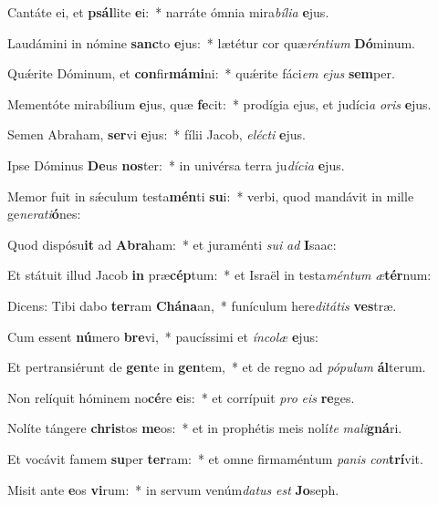 \item Cantáte ei, et \textbf{psál}lite \textbf{e}i:~* narráte ómnia mira\textit{bí}\textit{li}\textit{a} \textbf{e}jus.
\item Laudámini in nómine \textbf{sanc}to \textbf{e}jus:~* lætétur cor quæ\textit{rén}\textit{ti}\textit{um} \textbf{Dó}minum.
\item Quǽrite Dóminum, et \textbf{con}fir\textbf{má}\textbf{mi}ni:~* quǽrite fáci\textit{em} \textit{e}\textit{jus} \textbf{sem}per.
\item Mementóte mirabílium \textbf{e}jus, quæ \textbf{fe}cit:~* prodígia ejus, et judíci\textit{a} \textit{o}\textit{ris} \textbf{e}jus.
\item Semen Abraham, \textbf{ser}vi \textbf{e}jus:~* fílii Jacob, \textit{e}\textit{léc}\textit{ti} \textbf{e}jus.
\item Ipse Dóminus \textbf{De}us \textbf{nos}ter:~* in univérsa terra ju\textit{dí}\textit{ci}\textit{a} \textbf{e}jus.
\item Memor fuit in sǽculum testa\textbf{mén}ti \textbf{su}i:~* verbi, quod mandávit in mille ge\textit{ne}\textit{ra}\textit{ti}\textbf{ó}nes:
\item Quod dispósu\textbf{it} ad \textbf{A}\textbf{bra}ham:~* et juraménti \textit{su}\textit{i} \textit{ad} \textbf{I}saac:
\item Et státuit illud Jacob \textbf{in} præ\textbf{cép}tum:~* et Israël in testa\textit{mén}\textit{tum} \textit{æ}\textbf{tér}num:
\item Dicens: Tibi dabo \textbf{ter}ram \textbf{Chá}\textbf{na}an,~* funículum here\textit{di}\textit{tá}\textit{tis} \textbf{ves}træ.
\item Cum essent \textbf{nú}mero \textbf{bre}vi,~* paucíssimi et \textit{ín}\textit{co}\textit{læ} \textbf{e}jus:
\item Et pertransiérunt de \textbf{gen}te in \textbf{gen}tem,~* et de regno ad \textit{pó}\textit{pu}\textit{lum} \textbf{ál}terum.
\item Non relíquit hóminem no\textbf{cé}re \textbf{e}is:~* et corrípuit \textit{pro} \textit{e}\textit{is} \textbf{re}ges.
\item Nolíte tángere \textbf{chris}tos \textbf{me}os:~* et in prophétis meis nolí\textit{te} \textit{ma}\textit{li}\textbf{gná}ri.
\item Et vocávit famem \textbf{su}per \textbf{ter}ram:~* et omne firmaméntum \textit{pa}\textit{nis} \textit{con}\textbf{trí}vit.
\item Misit ante \textbf{e}os \textbf{vi}rum:~* in servum venúm\textit{da}\textit{tus} \textit{est} \textbf{Jo}seph.
